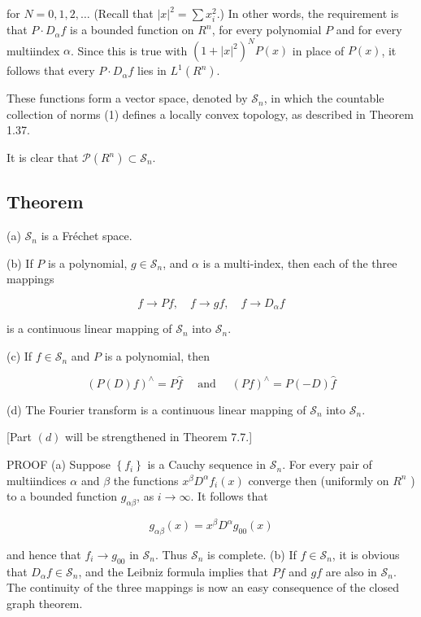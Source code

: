 \documentclass[10pt]{article}
\begin{document}
for $N=0,1,2, \ldots$ (Recall that $|x|^{2}=\sum x_{i}^{2}$.) In other words, the requirement is that $P \cdot D_{\alpha} f$ is a bounded function on $R^{n}$, for every polynomial $P$ and for every multiindex $\alpha$. Since this is true with $\left(1+|x|^{2}\right)^{N} P(x)$ in place of $P(x)$, it follows that every $P \cdot D_{\alpha} f$ lies in $L^{1}\left(R^{n}\right)$.

These functions form a vector space, denoted by $\mathscr{S}_{n}$, in which the countable collection of norms (1) defines a locally convex topology, as described in Theorem 1.37.

It is clear that $\mathscr{P}\left(R^{n}\right) \subset \mathscr{S}_{n}$.

\subsection{Theorem}
(a) $\mathscr{S}_{n}$ is a Fréchet space.

(b) If $P$ is a polynomial, $g \in \mathscr{S}_{n}$, and $\alpha$ is a multi-index, then each of the three mappings

$$
f \rightarrow P f, \quad f \rightarrow g f, \quad f \rightarrow D_{\alpha} f
$$

is a continuous linear mapping of $\mathscr{S}_{n}$ into $\mathscr{S}_{n}$.

(c) If $f \in \mathscr{S}_{n}$ and $P$ is a polynomial, then

$$
(P(D) f)^{\wedge}=P \hat{f} \quad \text { and } \quad(P f)^{\wedge}=P(-D) \hat{f}
$$

(d) The Fourier transform is a continuous linear mapping of $\mathscr{S}_{n}$ into $\mathscr{S}_{n}$.

[Part $(d)$ will be strengthened in Theorem 7.7.]

PROOF (a) Suppose $\left\{f_{i}\right\}$ is a Cauchy sequence in $\mathscr{S}_{n}$. For every pair of multiindices $\alpha$ and $\beta$ the functions $x^{\beta} D^{\alpha} f_{i}(x)$ converge then (uniformly on $R^{n}$ ) to a bounded function $g_{\alpha \beta}$, as $i \rightarrow \infty$. It follows that

$$
g_{\alpha \beta}(x)=x^{\beta} D^{\alpha} g_{00}(x)
$$

and hence that $f_{i} \rightarrow g_{00}$ in $\mathscr{S}_{n}$. Thus $\mathscr{S}_{n}$ is complete.
(b) If $f \in \mathscr{S}_{n}$, it is obvious that $D_{\alpha} f \in \mathscr{S}_{n}$, and the Leibniz formula implies that $P f$ and $g f$ are also in $\mathscr{S}_{n}$. The continuity of the three mappings is now an easy consequence of the closed graph theorem.
\end{document}
